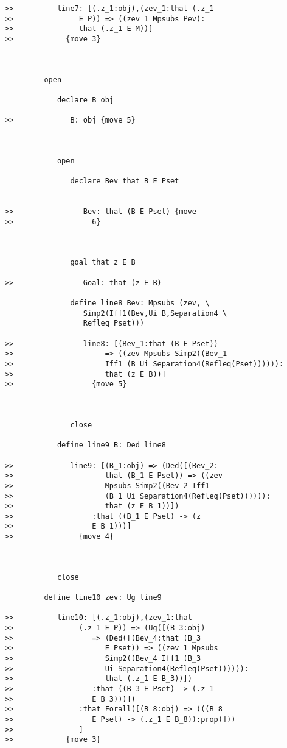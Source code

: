\documentclass[12pt]{article}
\begin{document}
\begin{verbatim}
>>          line7: [(.z_1:obj),(zev_1:that (.z_1
>>               E P)) => ((zev_1 Mpsubs Pev):
>>               that (.z_1 E M))]
>>            {move 3}



         open

            declare B obj

>>             B: obj {move 5}



            open

               declare Bev that B E Pset


>>                Bev: that (B E Pset) {move
>>                  6}



               goal that z E B

>>                Goal: that (z E B)

               define line8 Bev: Mpsubs (zev, \
                  Simp2(Iff1(Bev,Ui B,Separation4 \
                  Refleq Pset)))

>>                line8: [(Bev_1:that (B E Pset))
>>                     => ((zev Mpsubs Simp2((Bev_1
>>                     Iff1 (B Ui Separation4(Refleq(Pset)))))):
>>                     that (z E B))]
>>                  {move 5}



               close

            define line9 B: Ded line8

>>             line9: [(B_1:obj) => (Ded([(Bev_2:
>>                     that (B_1 E Pset)) => ((zev
>>                     Mpsubs Simp2((Bev_2 Iff1
>>                     (B_1 Ui Separation4(Refleq(Pset)))))):
>>                     that (z E B_1))])
>>                  :that ((B_1 E Pset) -> (z
>>                  E B_1)))]
>>               {move 4}



            close

         define line10 zev: Ug line9

>>          line10: [(.z_1:obj),(zev_1:that
>>               (.z_1 E P)) => (Ug([(B_3:obj)
>>                  => (Ded([(Bev_4:that (B_3
>>                     E Pset)) => ((zev_1 Mpsubs
>>                     Simp2((Bev_4 Iff1 (B_3
>>                     Ui Separation4(Refleq(Pset)))))):
>>                     that (.z_1 E B_3))])
>>                  :that ((B_3 E Pset) -> (.z_1
>>                  E B_3)))])
>>               :that Forall([(B_8:obj) => (((B_8
>>                  E Pset) -> (.z_1 E B_8)):prop)]))
>>               ]
>>            {move 3}




\end{verbatim}
\end{document}
